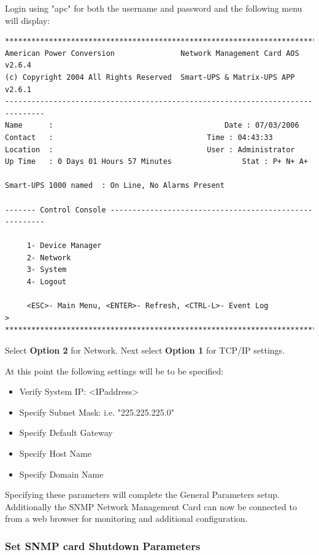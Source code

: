 {{{{{{{Login using "apc" for both the username and password and the following menu will display:





\footnotesize
\begin{verbatim}
*******************************************************************************
American Power Conversion               Network Management Card AOS      v2.6.4
(c) Copyright 2004 All Rights Reserved  Smart-UPS & Matrix-UPS APP       v2.6.1
-------------------------------------------------------------------------------
Name      : 	 	                              Date : 07/03/2006	       
Contact   :     		                      Time : 04:43:33
Location  : 			                      User : Administrator
Up Time   : 0 Days 01 Hours 57 Minutes                Stat : P+ N+ A+

Smart-UPS 1000 named  : On Line, No Alarms Present

------- Control Console -------------------------------------------------------

     1- Device Manager
     2- Network
     3- System
     4- Logout

     <ESC>- Main Menu, <ENTER>- Refresh, <CTRL-L>- Event Log
>
*******************************************************************************
\end{verbatim}







\normalsize
Select {\bf Option 2} for Network.
Next select {\bf Option 1} for TCP/IP settings.

At this point the following settings will be to be specified:

\begin{itemize}
\item Verify System IP: <IPaddress>
\item Specify Subnet Mask:  i.e. "225.225.225.0"
\item Specify Default Gateway
\item Specify Host Name
\item Specify Domain Name
\end{itemize}

Specifying these parameters will complete the General Parameters setup.  
Additionally the SNMP Network Management Card can now be connected to from 
a web browser for monitoring and additional configuration.


\subsubsection*{Set SNMP card Shutdown Parameters}

}}}}}}}
